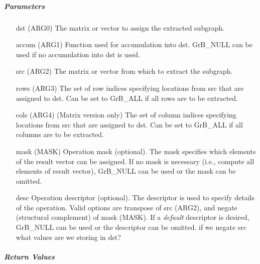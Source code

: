 \subparagraph{Parameters}

\begin{itemize}[leftmargin=1in]
	\item[{\sf dst (ARG0)}]   The matrix or vector to assign the extracted subgraph.
	\item[{\sf accum (ARG1)}] Function used for accumulation into dst.  {\sf GrB\_NULL}
                              can be used if no accumulation into dst is used.
	\item[{\sf src} (ARG2)]   The matrix or vector from which to extract the subgraph.
	\item[{\sf rows} (ARG3)]  The set of row indices specifying locations from src that
                              are assigned to dst. Can
                              be set to {\sf GrB\_ALL} if all rows are
                              to be extracted.
	\item[{\sf cols} (ARG4)]  (Matrix version only) The set of column indices specifying
                              locations from src that are assigned to dst. Can
                              be set to {\sf GrB\_ALL} if all columns are
                              to be extracted.

	\item[{\sf mask} (MASK)]  Operation mask (optional). The mask
	specifies which elements of the result vector can be assigned.
	If no mask is necessary (i.e., compute all elements of result
	vector), {\sf GrB\_NULL} can be used or the mask can be omitted.

	\item[{\sf desc}] Operation descriptor (optional). The descriptor
    is used to specify details of the operation. Valid options are transpose
    of src ({\sf ARG2}), and negate (structural complement) of mask ({\sf MASK}). If
    a \emph{default} descriptor is desired,	{\sf GrB\_NULL} can be
    used or the descriptor can be omitted. {\scott if we negate src what values
    are we storing in dst?}
\end{itemize}

\subparagraph{Return Values}


